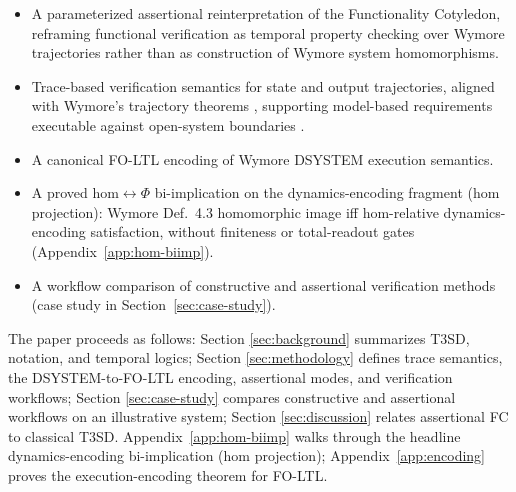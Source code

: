 \begin{itemize}
    \item A parameterized assertional reinterpretation of the Functionality Cotyledon, reframing functional verification as temporal property checking over Wymore trajectories rather than as construction of Wymore system homomorphisms.
    \item Trace-based verification semantics for state and output trajectories, aligned with Wymore's trajectory theorems \parencite{Wymore1993}, supporting model-based requirements executable against open-system boundaries \parencite{salado2019mbse}.
    \item A canonical FO-LTL encoding of Wymore DSYSTEM execution semantics.
    \item A proved hom$\leftrightarrow\Phi$ bi-implication on the dynamics-encoding fragment (hom projection): Wymore Def.~4.3 homomorphic image iff hom-relative dynamics-encoding satisfaction, without finiteness or total-readout gates (Appendix~\ref{app:hom-biimp}).
    \item A workflow comparison of constructive and assertional verification methods (case study in Section~\ref{sec:case-study}).
\end{itemize}

The paper proceeds as follows: Section \ref{sec:background} summarizes T3SD, notation, and temporal logics; Section \ref{sec:methodology} defines trace semantics, the DSYSTEM-to-FO-LTL encoding, assertional modes, and verification workflows; Section \ref{sec:case-study} compares constructive and assertional workflows on an illustrative system; Section \ref{sec:discussion} relates assertional FC to classical T3SD. Appendix~\ref{app:hom-biimp} walks through the headline dynamics-encoding bi-implication (hom projection); Appendix~\ref{app:encoding} proves the execution-encoding theorem for FO-LTL.
